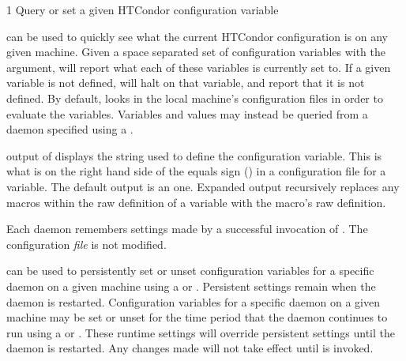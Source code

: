 \begin{ManPage}{\label{man-condor-config-val}}{1}
{Query or set a given HTCondor configuration variable}

\Synopsis {}




\Description

 can be used to quickly see what the current
HTCondor configuration is on any given machine.  
Given a space separated set of
configuration variables with the  argument,
 will report what each of these
variables is currently set to.  If a given variable is not defined,
 will halt on that variable, and report that it is
not defined.  By default,  looks in the local
machine's configuration files in order to evaluate the variables.
Variables and values may instead be queried from a daemon specified
using a .

 output of  displays the string used to
define the configuration variable.
This is what is on the right hand side of the equals sign (\Expr{=})
in a configuration file for a variable.
The default output is an  one.
Expanded output recursively replaces any macros within the raw definition
of a variable with the macro's raw definition.

Each daemon remembers settings made by a successful invocation
of .  
The configuration \emph{file} is not modified.  

 can be used to persistently set or unset 
configuration variables for a specific daemon on a given machine
using a  or  .
Persistent settings remain when the daemon is restarted.  
Configuration variables for a specific daemon on a given machine
may be set or unset for the time period that the daemon continues to run
using a  or  .
These runtime settings will override persistent settings until the daemon is restarted.
Any changes made will not take effect until  is invoked.


\end{ManPage}
